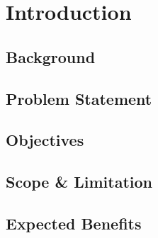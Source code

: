 \section{Introduction}
\label{sec:introduction}

\subsection{Background}
\label{subsec:background}

\subsection{Problem Statement}
\label{subsec:problem-statement}

\subsection{Objectives}
\label{subsec:objectives}

\subsection{Scope \& Limitation}
\label{subsec:scope-and-limitation}

\subsection{Expected Benefits}
\label{subsec:expected-benefits}